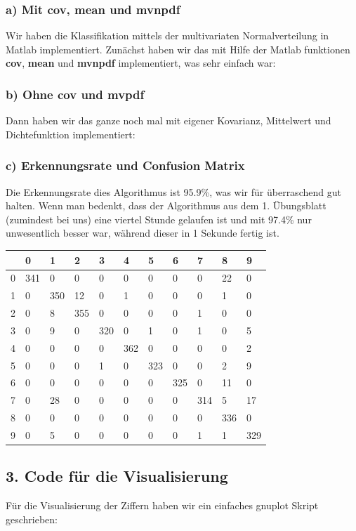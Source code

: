 \documentclass{article}
\begin{document}
\subsubsection*{a) Mit cov, mean und mvnpdf}
Wir haben die Klassifikation mittels der multivariaten
Normalverteilung in Matlab implementiert. Zunächst haben wir das mit
Hilfe der Matlab funktionen \textbf{cov}, \textbf{mean} und
\textbf{mvnpdf} implementiert, was sehr einfach war:



\subsubsection*{b) Ohne cov und mvpdf}
Dann haben wir das ganze noch mal mit eigener Kovarianz, Mittelwert
und Dichtefunktion implementiert:



\subsubsection*{c) Erkennungsrate und Confusion Matrix}
Die Erkennungsrate dies Algorithmus ist 95.9\%, was wir für
überraschend gut halten. Wenn man bedenkt, dass der Algorithmus aus
dem 1. Übungsblatt (zumindest bei uns) eine viertel Stunde gelaufen
ist und mit 97.4\% nur unwesentlich besser war, während dieser in 1
Sekunde fertig ist.

\begin{table}[h!]
  \begin{tabular}{|l|l|l|l|l|l|l|l|l|l|l|}
    \hline
    & 0   & 1   & 2   & 3   & 4   & 5   & 6   & 7   & 8   & 9   \\
    \hline
    0 & 341 & 0   & 0   & 0   & 0   & 0   & 0   & 0   & 22  & 0   \\
    1 & 0   & 350 & 12  & 0   & 1   & 0   & 0   & 0   & 1   & 0   \\
    2 & 0   & 8   & 355 & 0   & 0   & 0   & 0   & 1   & 0   & 0   \\
    3 & 0   & 9   & 0   & 320 & 0   & 1   & 0   & 1   & 0   & 5   \\
    4 & 0   & 0   & 0   & 0   & 362 & 0   & 0   & 0   & 0   & 2   \\
    5 & 0   & 0   & 0   & 1   & 0   & 323 & 0   & 0   & 2   & 9   \\
    6 & 0   & 0   & 0   & 0   & 0   & 0   & 325 & 0   & 11  & 0   \\
    7 & 0   & 28  & 0   & 0   & 0   & 0   & 0   & 314 & 5   & 17  \\
    8 & 0   & 0   & 0   & 0   & 0   & 0   & 0   & 0   & 336 & 0   \\
    9 & 0   & 5   & 0   & 0   & 0   & 0   & 0   & 1   & 1   & 329 \\
    \hline
  \end{tabular}
\end{table}

\subsection*{3. Code für die Visualisierung}
Für die Visualisierung der Ziffern haben wir ein einfaches gnuplot
Skript geschrieben:

\end{document}
